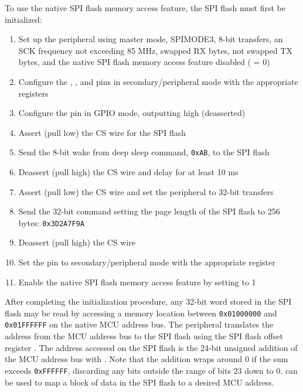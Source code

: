 To use the native SPI flash memory access feature, the SPI flash must first be initialized:
\begin{enumerate}
	\item Set up the  peripheral using master mode, SPIMODE3, 8-bit transfers, an SCK frequency not exceeding 85 MHz, swapped RX bytes, not swapped TX bytes, and the native SPI flash memory access feature disabled ( = 0)
	\item Configure the , , and  pins in secondary/peripheral mode with the appropriate  registers
	\item Configure the  pin in GPIO mode, outputting high (deasserted)
	\item Assert (pull low) the CS wire for the SPI flash
	\item Send the 8-bit wake from deep sleep command, \texttt{0xAB}, to the SPI flash
	\item Deassert (pull high) the CS wire and delay for at least 10 ms
	\item Assert (pull low) the CS wire and set the  peripheral to 32-bit transfers
	\item Send the 32-bit command setting the page length of the SPI flash to 256 bytes: \texttt{0x3D2A7F9A}
	\item Deassert (pull high) the CS wire
	\item Set the  pin to secondary/peripheral mode with the appropriate  register
	\item Enable the native SPI flash memory access feature by setting  to 1
\end{enumerate}

After completing the initialization procedure, any 32-bit word stored in the SPI flash may be read by accessing a memory location between \texttt{0x01000000} and \texttt{0x01FFFFFF} on the native MCU address bus. The  peripheral translates the address from the MCU address bus to the SPI flash using the SPI flash offset register . The address accessed on the SPI flash is the 24-bit unsigned addition of the MCU address bus with . Note that the addition wraps around 0 if the sum exceeds \texttt{0xFFFFFF}, discarding any bits outside the range of bits 23 down to 0.  can be used to map a block of data in the SPI flash to a desired MCU address.



